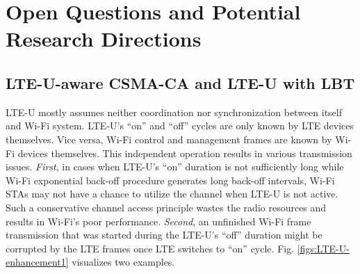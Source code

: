 %
%
%
\chapter{Open Questions and Potential Research Directions}
\label{open-research} %



\section{LTE-U-aware CSMA-CA and LTE-U with LBT}
\label{subsection:LTE-U-aware}

LTE-U mostly assumes neither coordination nor synchronization between itself and Wi-Fi system. LTE-U's ``on'' and ``off'' cycles are only known by LTE devices themselves. Vice versa, Wi-Fi control and management frames are known by Wi-Fi devices themselves. This independent operation results in various transmission issues. \textit{First}, in cases when LTE-U's ``on'' duration is not sufficiently long while Wi-Fi exponential back-off procedure generates long back-off intervals, Wi-Fi STAs may not have a chance to utilize the channel when LTE-U is not active. Such a conservative channel access principle wastes the radio resources and results in Wi-Fi's poor performance. \textit{Second}, an unfinished Wi-Fi frame transmission that was started during the LTE-U's ``off'' duration might be corrupted by the LTE frames once LTE switches to ``on'' cycle. Fig. \ref{figs:LTE-U-enhancement1} visualizes two examples.

